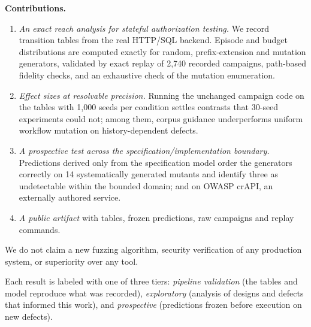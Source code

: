 \documentclass[conference]{IEEEtran}
\begin{document}
\noindent\textbf{Contributions.}
\begin{enumerate}
\item \emph{An exact reach analysis for stateful authorization testing.} We record
transition tables from the real HTTP/SQL backend. Episode and budget distributions are
computed exactly for random, prefix-extension and mutation generators, validated by exact
replay of 2{,}740 recorded campaigns, path-based fidelity checks, and an exhaustive check
of the mutation enumeration.
\item \emph{Effect sizes at resolvable precision.} Running the unchanged campaign code on
the tables with 1{,}000 seeds per condition settles contrasts that 30-seed experiments
could not; among them, corpus guidance underperforms uniform workflow mutation on
history-dependent defects.
\item \emph{A prospective test across the specification/implementation boundary.}
Predictions derived only from the specification model order the generators correctly on
14 systematically generated mutants and identify three as undetectable within the bounded
domain; and on OWASP crAPI, an externally authored service.
\item \emph{A public artifact} with tables, frozen predictions, raw campaigns and replay
commands.
\end{enumerate}

We do not claim a new fuzzing algorithm, security verification of any production system,
or superiority over any tool.

Each result is labeled with one of three tiers: \emph{pipeline validation} (the tables
and model reproduce what was recorded), \emph{exploratory} (analysis of designs and
defects that informed this work), and \emph{prospective} (predictions frozen before
execution on new defects).
\end{document}
